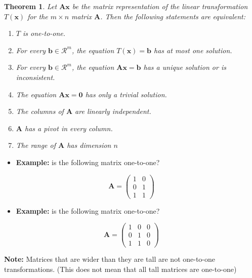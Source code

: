 \documentclass[
]{book}
\providecommand{\tightlist}{%
  \setlength{\itemsep}{0pt}\setlength{\parskip}{0pt}}
\newtheorem{theorem}{Theorem}[chapter]
\theoremstyle{definition}
\theoremstyle{definition}
\theoremstyle{definition}
\theoremstyle{definition}
\theoremstyle{remark}
\begin{document}
\begin{theorem}

Let \(\mathbf{A}\mathbf{x}\) be the matrix representation of the linear transformation \(T(\mathbf{x})\) for the \(m \times n\) matrix \(\mathbf{A}\). Then the following statements are equivalent:

\begin{enumerate}
\def\labelenumi{\arabic{enumi})}
\item
  \(T\) is one-to-one.
\item
  For every \(\mathbf{b} \in \mathcal{R}^m\), the equation \(T(\mathbf{x}) = \mathbf{b}\) has at most one solution.
\item
  For every \(\mathbf{b} \in \mathcal{R}^m\), the equation \(\mathbf{A}\mathbf{x} = \mathbf{b}\) has a unique solution or is inconsistent.
\item
  The equation \(\mathbf{A}\mathbf{x} = \mathbf{0}\) has only a trivial solution.
\item
  The columns of \(\mathbf{A}\) are linearly independent.
\item
  \(\mathbf{A}\) has a pivot in every column.
\item
  The range of \(\mathbf{A}\) has dimension \(n\)
\end{enumerate}

\end{theorem}

\begin{itemize}
\tightlist
\item
  \textbf{Example:} is the following matrix one-to-one?
\end{itemize}

\[
\mathbf{A} = \begin{pmatrix}
1 & 0 \\
0 & 1 \\
1 & 1
\end{pmatrix}
\]

\begin{itemize}
\tightlist
\item
  \textbf{Example:} is the following matrix one-to-one?
\end{itemize}

\[
\mathbf{A} = \begin{pmatrix}
1 & 0 & 0 \\
0 & 1 & 0 \\
1 & 1 & 0
\end{pmatrix}
\]

\textbf{Note:} Matrices that are wider than they are tall are not one-to-one transformations. (This does not mean that all tall matrices are one-to-one)
\end{document}
